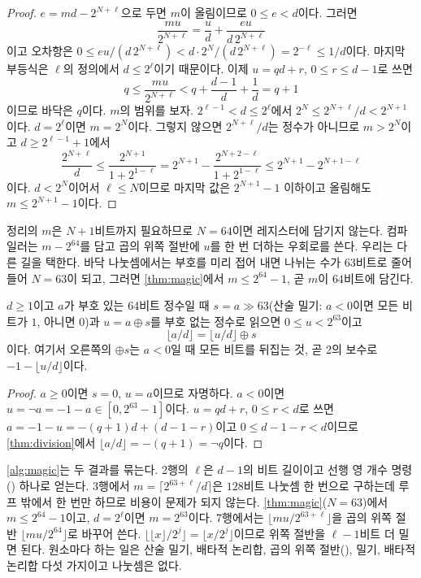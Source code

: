\begin{proof}
$e=md-2^{N+\ell}$으로 두면 $m$이 올림이므로 $0\le e<d$이다. 그러면
\[
\frac{mu}{2^{N+\ell}}=\frac{u}{d}+\frac{eu}{d\,2^{N+\ell}}
\]
이고 오차항은 $0\le eu/(d\,2^{N+\ell})<d\cdot2^N/(d\,2^{N+\ell})=2^{-\ell}\le1/d$이다. 마지막 부등식은 $\ell$의 정의에서 $d\le2^\ell$이기 때문이다. 이제 $u=qd+r$, $0\le r\le d-1$로 쓰면
\[
q\le\frac{mu}{2^{N+\ell}}<q+\frac{d-1}{d}+\frac1d=q+1
\]
이므로 바닥은 $q$이다. $m$의 범위를 보자. $2^{\ell-1}<d\le2^\ell$에서 $2^N\le2^{N+\ell}/d<2^{N+1}$이다. $d=2^\ell$이면 $m=2^N$이다. 그렇지 않으면 $2^{N+\ell}/d$는 정수가 아니므로 $m>2^N$이고 $d\ge2^{\ell-1}+1$에서
\[
\frac{2^{N+\ell}}{d}\le\frac{2^{N+1}}{1+2^{1-\ell}}=2^{N+1}-\frac{2^{N+2-\ell}}{1+2^{1-\ell}}\le2^{N+1}-2^{N+1-\ell}
\]
이다. $d<2^N$이어서 $\ell\le N$이므로 마지막 값은 $2^{N+1}-1$ 이하이고 올림해도 $m\le2^{N+1}-1$이다.
\end{proof}

정리의 $m$은 $N+1$비트까지 필요하므로 $N=64$이면 레지스터에 담기지 않는다. 컴파일러는 $m-2^{64}$를 담고 곱의 위쪽 절반에 $u$를 한 번 더하는 우회로를 쓴다. 우리는 다른 길을 택한다. 바닥 나눗셈에서는 부호를 미리 접어 내면 나뉘는 수가 $63$비트로 줄어들어 $N=63$이 되고, 그러면 \cref{thm:magic}에서 $m\le2^{64}-1$, 곧 $m$이 $64$비트에 담긴다.

\begin{proposition}
\label{prop:sign-fold}
$d\ge1$이고 $a$가 부호 있는 64비트 정수일 때 $s=a\gg63$(산술 밀기: $a<0$이면 모든 비트가 $1$, 아니면 $0$)과 $u=a\oplus s$를 부호 없는 정수로 읽으면 $0\le u<2^{63}$이고
\[
\lfloor a/d\rfloor=\lfloor u/d\rfloor\oplus s
\]
이다. 여기서 오른쪽의 $\oplus s$는 $a<0$일 때 모든 비트를 뒤집는 것, 곧 2의 보수로 $-1-\lfloor u/d\rfloor$이다.
\end{proposition}

\begin{proof}
$a\ge0$이면 $s=0$, $u=a$이므로 자명하다. $a<0$이면 $u=\lnot a=-1-a\in[0,2^{63}-1]$이다. $u=qd+r$, $0\le r<d$로 쓰면 $a=-1-u=-(q+1)d+(d-1-r)$이고 $0\le d-1-r<d$이므로 \cref{thm:division}에서 $\lfloor a/d\rfloor=-(q+1)=\lnot q$이다.
\end{proof}

\cref{alg:magic}는 두 결과를 묶는다. 2행의 $\ell$은 $d-1$의 비트 길이이고 선행 영 개수 명령() 하나로 얻는다. 3행에서 $m=\lceil2^{63+\ell}/d\rceil$은 $128$비트 나눗셈 한 번으로 구하는데 루프 밖에서 한 번만 하므로 비용이 문제가 되지 않는다. \cref{thm:magic}($N=63$)에서 $m\le2^{64}-1$이고, $d=2^\ell$이면 $m=2^{63}$이다. 7행에서는 $\lfloor mu/2^{63+\ell}\rfloor$을 곱의 위쪽 절반 $\lfloor mu/2^{64}\rfloor$로 바꾸어 쓴다. $\lfloor\lfloor x\rfloor/2^{j}\rfloor=\lfloor x/2^j\rfloor$이므로 위쪽 절반을 $\ell-1$비트 더 밀면 된다. 원소마다 하는 일은 산술 밀기, 배타적 논리합, 곱의 위쪽 절반(), 밀기, 배타적 논리합 다섯 가지이고 나눗셈은 없다.


